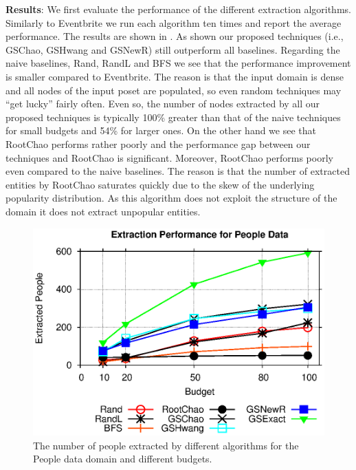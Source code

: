 \vspace{5pt}\noindent\textbf{Results}: We first evaluate the performance of the different extraction algorithms. Similarly to Eventbrite we run each algorithm ten times and report the average performance. The results are shown in . As shown our proposed techniques (i.e., GSChao, GSHwang and GSNewR) still outperform all baselines. Regarding the naive baselines, Rand, RandL and BFS we see that the performance improvement is smaller compared to Eventbrite. The reason is that the input domain is dense and all nodes of the input poset are populated, so even random techniques may ``get lucky'' fairly often. Even so, the number of nodes extracted by all our proposed techniques is typically 100\% greater than that of the naive techniques for small budgets and 54\% for larger ones. On the other hand we see that RootChao performs rather poorly and the performance gap between our techniques and RootChao is significant. Moreover, RootChao performs poorly even compared to the naive baselines. The reason is that the number of extracted entities by RootChao saturates quickly due to the skew of the underlying popularity distribution. As this algorithm does not exploit the structure of the domain it does not extract unpopular entities.

\begin{figure}[h]
	\vspace{-10pt}
	\begin{center}
	\includegraphics[clip,scale=0.5]{figs/poExtraction.eps}
	\caption{The number of people extracted by different algorithms for the People data domain and different budgets.}
	\label{fig:poextraction}
	\end{center}
	\vspace{-15pt}
\end{figure}

